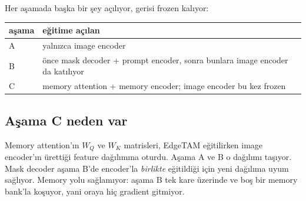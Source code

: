 Her aşamada başka bir şey açılıyor, gerisi frozen kalıyor:

\begin{center}\footnotesize
\begin{tabular}{@{}l>{\raggedright\arraybackslash}p{95mm}@{}}
  \toprule
  \textbf{aşama} & \textbf{eğitime açılan} \\
  \midrule
  A & yalnızca image encoder \\
  B & önce mask decoder + prompt encoder, sonra bunlara image encoder da
      katılıyor \\
  C & memory attention + memory encoder; image encoder bu kez frozen \\
  \bottomrule
\end{tabular}
\end{center}

\subsection*{Aşama C neden var}

Memory attention'ın $W_Q$ ve $W_K$ matrisleri, EdgeTAM eğitilirken image
encoder'ın ürettiği feature dağılımına oturdu. Aşama A ve B o dağılımı
taşıyor. Mask decoder aşama B'de encoder'la \emph{birlikte} eğitildiği için
yeni dağılıma uyum sağlıyor. Memory yolu sağlamıyor: aşama B tek kare
üzerinde ve boş bir memory bank'la koşuyor, yani oraya hiç gradient
gitmiyor.

